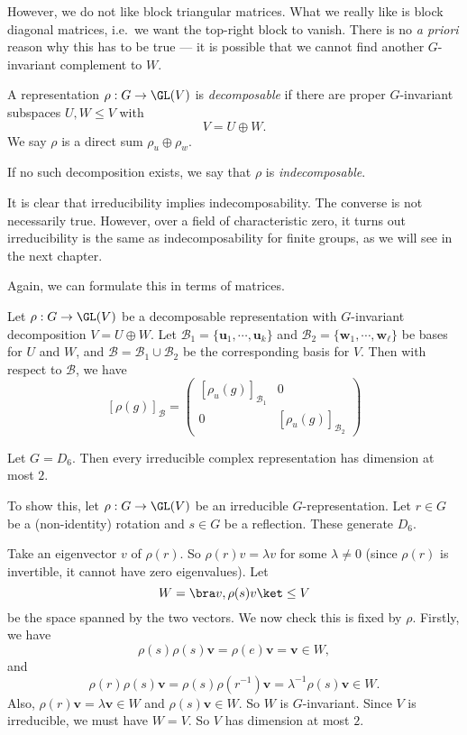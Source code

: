 \documentclass[a4paper]{article}
\begin{document}
However, we do not like block triangular matrices. What we really like is block diagonal matrices, i.e.\ we want the top-right block to vanish. There is no \emph{a priori} reason why this has to be true --- it is possible that we cannot find another $G$-invariant complement to $W$.

\begin{defi}
  A representation $\rho: G \to \GL(V)$ is \emph{decomposable} if there are proper $G$-invariant subspaces $U, W \leq V$ with
  \[
    V = U \oplus W.
  \]
  We say $\rho$ is a direct sum $\rho_u \oplus \rho_w$.

  If no such decomposition exists, we say that $\rho$ is \emph{indecomposable}.
\end{defi}
It is clear that irreducibility implies indecomposability. The converse is not necessarily true. However, over a field of characteristic zero, it turns out irreducibility is the same as indecomposability for finite groups, as we will see in the next chapter.

Again, we can formulate this in terms of matrices.
\begin{lemma}
  Let $\rho: G \to \GL(V)$ be a decomposable representation with $G$-invariant decomposition $V = U \oplus W$. Let $\mathcal{B}_1 = \{\mathbf{u}_1, \cdots, \mathbf{u}_k\}$ and $\mathcal{B}_2 = \{\mathbf{w}_1, \cdots, \mathbf{w}_\ell\}$ be bases for $U$ and $W$, and $\mathcal{B} = \mathcal{B}_1 \cup \mathcal{B}_2$ be the corresponding basis for $V$. Then with respect to $\mathcal{B}$, we have
  \[
    [\rho(g)]_{\mathcal{B}} =
    \begin{pmatrix}
      [\rho_u(g)]_{\mathcal{B}_1} & 0\\
      0 & [\rho_u (g)]_{\mathcal{B}_2}
    \end{pmatrix}
  \]
\end{lemma}

\begin{eg}
  Let $G = D_6$. Then every irreducible complex representation has dimension at most $2$.

  To show this, let $\rho: G \to \GL(V)$ be an irreducible $G$-representation. Let $r \in G$ be a (non-identity) rotation and $s\in G$ be a reflection. These generate $D_6$.

  Take an eigenvector $v$ of $\rho(r)$. So $\rho(r) v = \lambda v$ for some $\lambda \not= 0$ (since $\rho(r)$ is invertible, it cannot have zero eigenvalues). Let
  \[
    W = \bra v, \rho(s) v\ket \leq V
  \]
  be the space spanned by the two vectors. We now check this is fixed by $\rho$. Firstly, we have
  \[
    \rho(s)\rho(s) \mathbf{v} = \rho(e) \mathbf{v} = \mathbf{v} \in W,
  \]
  and
  \[
    \rho(r)\rho(s) \mathbf{v} = \rho(s) \rho(r^{-1}) \mathbf{v} = \lambda^{-1} \rho(s) \mathbf{v} \in W.
  \]
  Also, $\rho(r) \mathbf{v} = \lambda \mathbf{v} \in W$ and $\rho(s) \mathbf{v} \in W$. So $W$ is $G$-invariant. Since $V$ is irreducible, we must have $W = V$. So $V$ has dimension at most $2$.
\end{eg}
\end{document}
